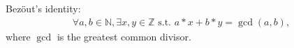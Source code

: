 \documentclass[10pt]{article}
\begin{document}
Bez\"out's identity:
\begin{eqnarray}
\forall a,b \in \mathbb{N}, \exists x,y \in \mathbb{Z} \text{ s.t. } a*x + b*y = \gcd(a,b),
\end{eqnarray}
where $\gcd$ is the greatest common divisor.
\end{document}
